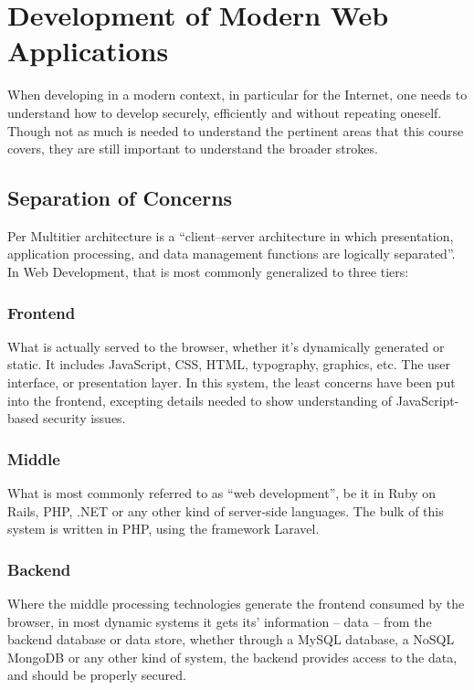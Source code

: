 \chapter{Development of Modern Web Applications}
\label{ch:theory}
\noindent
When developing in a modern context, in particular for the Internet, one needs to
understand how to develop securely, efficiently and without repeating oneself. Though not as much is needed to understand the pertinent areas that this course covers, they are still important to understand the broader strokes.

\section{Separation of Concerns}
\label{sec:architecture}
\noindent
Per \citep{Wikipedia2013ma} Multitier architecture is a ``client–server architecture in which presentation, application processing, and data management functions are logically separated''. In Web Development, that is most commonly generalized to three tiers:

\subsection{Frontend}
\noindent
What is actually served to the browser, whether it's dynamically generated or static. It includes JavaScript, CSS, HTML, typography, graphics, etc. The user interface, or presentation layer. In this system, the least concerns have been put into the frontend, excepting details needed to show understanding of JavaScript-based security issues.

\subsection{Middle}
\noindent
What is most commonly referred to as ``web development'', be it in Ruby on Rails, PHP,
.NET or any other kind of server-side languages. The bulk of this system is written in PHP,
using the framework Laravel.

\subsection{Backend}
\noindent
Where the middle processing technologies generate the frontend consumed by the browser, in most dynamic systems it gets its' information -- data -- from the backend database or data store, whether through a MySQL database, a NoSQL MongoDB or any other kind of system, the backend provides access to the data, and should be properly secured.

